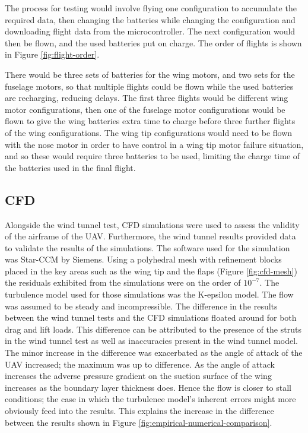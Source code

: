 \documentclass[../../main.tex]{subfiles}
\begin{document}
The process for testing would involve flying one configuration to accumulate the required data, then changing the batteries while changing the configuration and downloading flight data from the microcontroller.
The next configuration would then be flown, and the used batteries put on charge.
The order of flights is shown in Figure \ref{fig:flight-order}. 


There would be three sets of batteries for the wing motors, and two sets for the fuselage motors, so that multiple flights could be flown while the used batteries are recharging, reducing delays.
The first three flights would be different wing motor configurations, then one of the fuselage motor configurations would be flown to give the wing batteries extra time to charge before three further flights of the wing configurations.
The wing tip configurations would need to be flown with the nose motor in order to have control in a wing tip motor failure situation, and so these would require three batteries to be used, limiting the charge time of the batteries used in the final flight.

\subsection{CFD} \label{sec:project-review:testing-and-evaluation:cfd}

Alongside the wind tunnel test, CFD simulations were used to assess the validity of the airframe of the UAV.
Furthermore, the wind tunnel results provided data to validate the results of the simulations.
The software used for the simulation was Star-CCM by Siemens.
Using a polyhedral mesh with refinement blocks placed in the key areas such as the wing tip and the flaps (Figure \ref{fig:cfd-mesh}) the residuals exhibited from the simulations were on the order of $10^{-7}$.
The turbulence model used for those simulations was the K-epsilon model.
The flow was assumed to be steady and incompressible.
The difference in the results between the wind tunnel tests and the CFD simulations floated around  for both drag and lift loads.
This difference can be attributed to the presence of the struts in the wind tunnel test as well as inaccuracies present in the wind tunnel model.
The minor increase in the difference was exacerbated as the angle of attack of the UAV increased; the maximum was up to  difference.
As the angle of attack increases the adverse pressure gradient on the suction surface of the wing increases as the boundary layer thickness does.
Hence the flow is closer to stall conditions; the case in which the turbulence model's inherent errors might more obviously feed into the results.
This explains the increase in the difference between the results shown in Figure \ref{fig:empirical-numerical-comparison}. 
\end{document}

